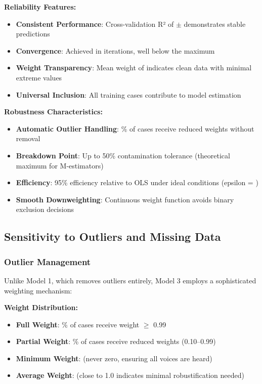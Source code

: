\textbf{Reliability Features:}
\begin{itemize}
    \item \textbf{Consistent Performance}: Cross-validation R² of \ModelThreeCVMean{} $\pm$ \ModelThreeCVStd{} demonstrates stable predictions
    \item \textbf{Convergence}: Achieved in \ModelThreeNumIterations{} iterations, well below the maximum
    \item \textbf{Weight Transparency}: Mean weight of \ModelThreeMeanWeight{} indicates clean data with minimal extreme values
    \item \textbf{Universal Inclusion}: All \ModelThreeTrainingSamples{} training cases contribute to model estimation
\end{itemize}

\textbf{Robustness Characteristics:}
\begin{itemize}
    \item \textbf{Automatic Outlier Handling}: \ModelThreeOutlierPercentage{}\% of cases receive reduced weights without removal
    \item \textbf{Breakdown Point}: Up to 50\% contamination tolerance (theoretical maximum for M-estimators)
    \item \textbf{Efficiency}: 95\% efficiency relative to OLS under ideal conditions (epsilon = \ModelThreeEpsilon{})
    \item \textbf{Smooth Downweighting}: Continuous weight function avoids binary exclusion decisions
\end{itemize}

\subsection{Sensitivity to Outliers and Missing Data}

\subsubsection{Outlier Management}

Unlike Model 1, which removes outliers entirely, Model 3 employs a sophisticated weighting mechanism:

\textbf{Weight Distribution:}
\begin{itemize}
    \item \textbf{Full Weight}: \ModelThreeFullWeightPct{}\% of cases receive weight $\geq$ 0.99
    \item \textbf{Partial Weight}: \ModelThreeOutlierPercentage{}\% of cases receive reduced weights (0.10--0.99)
    \item \textbf{Minimum Weight}: \ModelThreeMinWeight{} (never zero, ensuring all voices are heard)
    \item \textbf{Average Weight}: \ModelThreeMeanWeight{} (close to 1.0 indicates minimal robustification needed)
\end{itemize}

